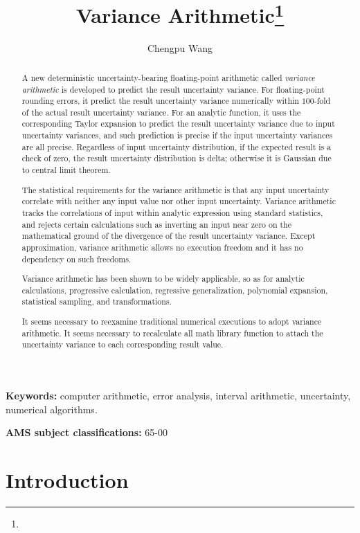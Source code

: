 \documentclass[twoside]{article}
\title{Variance Arithmetic\footnote{\whenaccepted}}
\author{Chengpu Wang
\institution{40 Grossman Street, Melville, NY 11747, USA}
\email{Chengpu@gmail.com}}
\date{}
\numberwithin{equation}{section}
\newcommand{\keywords}[1]{\small\textbf{Keywords: }#1}
\newcommand{\AMSsubj}[1]{\noindent\textbf{AMS subject classifications: }#1}
\begin{document}
\maketitle
\begin{abstract}

A new deterministic uncertainty-bearing floating-point arithmetic called \emph{variance arithmetic} is developed to predict the result uncertainty variance. 
For floating-point rounding errors, it predict the result uncertainty variance numerically within $100$-fold of the actual result uncertainty variance.
For an analytic function, it uses the corresponding Taylor expansion to predict the result uncertainty variance due to input uncertainty variances, and such prediction is precise if the input uncertainty variances are all precise.
Regardless of input uncertainty distribution, if the expected result is a check of zero, the result uncertainty distribution is delta; otherwise it is Gaussian due to central limit theorem.

The statistical requirements for the variance arithmetic is that any input uncertainty correlate with neither any input value nor other input uncertainty. 
Variance arithmetic tracks the correlations of input within analytic expression using standard statistics, and rejects certain calculations such as inverting an input near zero on the mathematical ground of the divergence of the result uncertainty variance.
Except approximation, variance arithmetic allows no execution freedom and it has no dependency on such freedoms.

Variance arithmetic has been shown to be widely applicable, so as for analytic calculations, progressive calculation, regressive generalization, polynomial expansion, statistical sampling, and transformations.

It seems necessary to reexamine traditional numerical executions to adopt variance arithmetic.
It seems necessary to recalculate all math library function to attach the uncertainty variance to each corresponding result value.

\end{abstract}
\keywords{computer arithmetic, error analysis, interval arithmetic, uncertainty, numerical algorithms.}

\AMSsubj{65-00}



\clearpage
\section{Introduction}
\label{sec: introduction}
\end{document}
